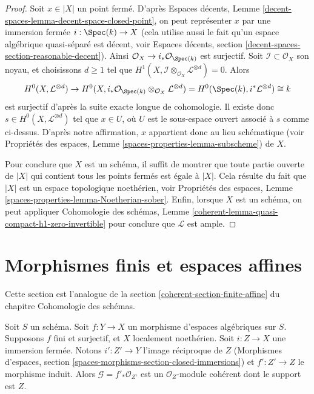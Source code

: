 \begin{proof}
\medskip\noindent
Soit $x \in |X|$ un point fermé. D'après Espaces décents, Lemme
\ref{decent-spaces-lemma-decent-space-closed-point},
on peut représenter $x$ par une immersion fermée $i : \Spec(k) \to X$
(cela utilise aussi le fait qu'un espace algébrique quasi-séparé est
décent, voir Espaces décents, section
\ref{decent-spaces-section-reasonable-decent}).
Ainsi $\mathcal{O}_X \to i_*\mathcal{O}_{\Spec(k)}$ est surjectif.
Soit $\mathcal{I} \subset \mathcal{O}_X$ son noyau, et choisissons
$d \geq 1$ tel que
$H^1(X, \mathcal{I} \otimes_{\mathcal{O}_X} \mathcal{L}^{\otimes d}) = 0$.
Alors
$$
H^0(X, \mathcal{L}^{\otimes d}) \to
H^0(X,
i_*\mathcal{O}_{\Spec(k)} \otimes_{\mathcal{O}_X} \mathcal{L}^{\otimes d}) =
H^0(\Spec(k), i^*\mathcal{L}^{\otimes d}) \cong k
$$
est surjectif d'après la suite exacte longue de cohomologie. Il existe donc
$s \in H^0(X, \mathcal{L}^{\otimes d})$
tel que $x \in U$, où $U$ est le sous-espace ouvert associé à $s$
comme ci-dessus. D'après notre affirmation, $x$ appartient donc au lieu schématique
(voir Propriétés des espaces, Lemme \ref{spaces-properties-lemma-subscheme})
de $X$.

\medskip\noindent
Pour conclure que $X$ est un schéma, il suffit de montrer que
toute partie ouverte de $|X|$ qui contient tous les points fermés
est égale à $|X|$. Cela résulte du fait que $|X|$
est un espace topologique noethérien, voir
Propriétés des espaces, Lemme \ref{spaces-properties-lemma-Noetherian-sober}.
Enfin, lorsque $X$ est un schéma, on peut appliquer
Cohomologie des schémas, Lemme
\ref{coherent-lemma-quasi-compact-h1-zero-invertible}
pour conclure que $\mathcal{L}$ est ample.
\end{proof}









\section{Morphismes finis et espaces affines}
\label{section-finite-affine}

\noindent
Cette section est l'analogue de la
section \ref{coherent-section-finite-affine} du chapitre Cohomologie des schémas.

\begin{lemma}
\label{lemma-finite-morphism-Noetherian}
Soit $S$ un schéma. Soit $f : Y \to X$ un morphisme d'espaces algébriques
sur $S$. Supposons $f$ fini et surjectif, et $X$ localement noethérien.
Soit $i : Z \to X$ une immersion fermée. Notons $i' : Z' \to Y$
l'image réciproque de $Z$
(Morphismes d'espaces, section \ref{spaces-morphisms-section-closed-immersions})
et $f' : Z' \to Z$
le morphisme induit. Alors $\mathcal{G} = f'_*\mathcal{O}_{Z'}$
est un $\mathcal{O}_Z$-module cohérent dont le support est $Z$.
\end{lemma}

